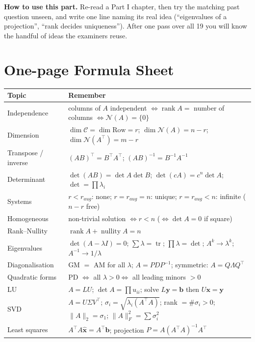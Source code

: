 \documentclass[11pt,a4paper]{article}
\newcommand{\T}{^{\top}}
\newcommand{\rank}{\operatorname{rank}}
\newcommand{\nullity}{\operatorname{nullity}}
\newcommand{\tr}{\operatorname{tr}}
\newcommand{\Null}{\mathcal{N}}
\newcommand{\Col}{\mathcal{C}}
\begin{document}
\begin{intuition}
\textbf{How to use this part.} Re-read a Part I chapter, then try the matching past question unseen, and write one line naming its real idea (``eigenvalues of a projection'', ``rank decides uniqueness''). After one pass over all 19 you will know the handful of ideas the examiners reuse.
\end{intuition}

\newpage
\section{One-page Formula Sheet}
\small
\begin{center}
\begin{tabularx}{\textwidth}{>{\raggedright\arraybackslash}p{3.1cm} >{\raggedright\arraybackslash}X}
\toprule
\textbf{Topic} & \textbf{Remember}\\
\midrule
Independence & columns of $A$ independent $\iff\rank A=$ number of columns $\iff\Null(A)=\{0\}$\\
Dimension & $\dim\Col=\dim\text{Row}=r$; $\dim\Null(A)=n-r$; $\dim\Null(A\T)=m-r$\\
Transpose / inverse & $(AB)\T=B\T A\T$; $(AB)^{-1}=B^{-1}A^{-1}$\\
Determinant & $\det(AB)=\det A\det B$; $\det(cA)=c^n\det A$; $\det=\prod\lambda_i$\\
Systems & $r<r_{aug}$: none; $r=r_{aug}=n$: unique; $r=r_{aug}<n$: infinite ($n-r$ free)\\
Homogeneous & non-trivial solution $\iff r<n$ ($\iff\det A=0$ if square)\\
Rank--Nullity & $\rank A+\nullity A=n$\\
Eigenvalues & $\det(A-\lambda I)=0$; $\sum\lambda=\tr$; $\prod\lambda=\det$; $A^k\to\lambda^k$; $A^{-1}\to1/\lambda$\\
Diagonalisation & GM $=$ AM for all $\lambda$; $A=PDP^{-1}$; symmetric: $A=Q\Lambda Q\T$\\
Quadratic forms & PD $\iff$ all $\lambda>0\iff$ all leading minors $>0$\\
LU & $A=LU$; $\det A=\prod u_{ii}$; solve $L\mathbf y=\mathbf b$ then $U\mathbf x=\mathbf y$\\
SVD & $A=U\Sigma V\T$; $\sigma_i=\sqrt{\lambda_i(A\T A)}$; rank $=\#\sigma_i>0$; $\|A\|_2=\sigma_1$; $\|A\|_F^2=\sum\sigma_i^2$\\
Least squares & $A\T A\hat{\mathbf x}=A\T\mathbf b$; projection $P=A(A\T A)^{-1}A\T$\\
\bottomrule
\end{tabularx}
\end{center}
\normalsize
\end{document}

